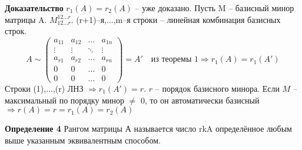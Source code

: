 \documentclass[a4paper,12pt]{article} %
\begin{document}
\textbf{Доказательство}
$r_1(A) = r_2(A)$ -- уже доказано. Пусть M -- базисный минор матрицы A. $M_{12\dotso r}^{12\dotso r}$. (r+1)--я,$\dotso$,m--я строки -- линейная комбинация базисных строк.
$$
A\sim\begin{pmatrix}
	a_{11} &  a_{12} & \dotso & a_{1n} \\
	\vdots & \vdots &\ddots & \vdots\\
	a_{r1} & a_{r2}& \dotso & a_{rn}\\
	0 & 0 &\dotso & 0\\
	0 & 0 &\dotso & 0
\end{pmatrix} = A' \quad \text{из теоремы 1} \Rightarrow r_1(A) = r_1(A')
$$
Строки (1),$\dotso$,(r) ЛНЗ $\Rightarrow r_1(A') = r$. $r$ -- порядок базисного минора. Если $M$ -- максимальный по порядку минор $\neq$ 0, то он автоматически базисный $\Rightarrow r(A) = r = r_1(A) = r_2(A)$

\textbf{Определение 4}
Рангом матрицы А называется число rkA определённое любым выше указанным эквивалентным способом.
	
\end{document}
